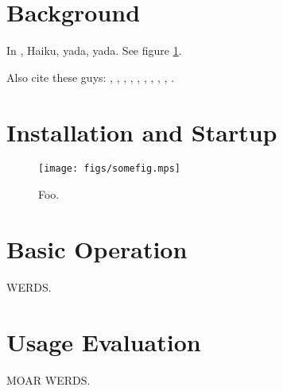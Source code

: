 \documentclass{article}
\begin{document}
\maketitle

\section{Background}

In \cite{BeosWiki}, Haiku, yada, yada.  See figure \ref{fig:foo}.

Also cite these guys: \cite{HaikuWiki}, \cite{HaikuAbout}, \cite{HaikuFaq}, \cite{HaikuHist}, \cite{HaikuContrib}, \cite{HaikuComm}, \cite{HaikuWelcome}, \cite{HaikuUserGuide}, \cite{HaikuHIG}, \cite{HaikuIcon}.

\section{Installation and Startup}

\begin{figure}[h]
\centering
\texttt{[image: figs/somefig.mps]}
\caption{Foo.}
\label{fig:foo}
\end{figure}

\section{Basic Operation}

WERDS.

\section{Usage Evaluation}

MOAR WERDS.

{}

\end{document}
